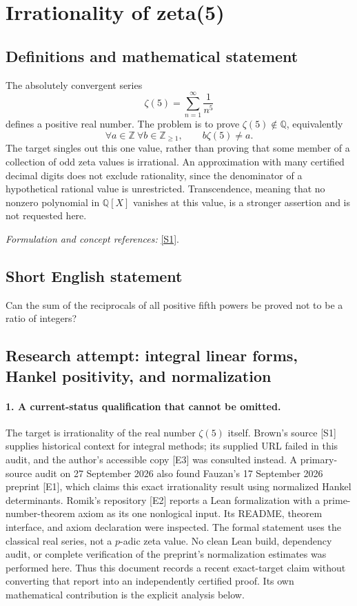 \documentclass[11pt]{article}
\begin{document}
\section*{\texorpdfstring{Irrationality of zeta(5)}{Irrationality of zeta(5)}}\label{statement}
\subsection{Definitions and mathematical statement}
The absolutely convergent series
\[
 \zeta(5)=\sum_{n=1}^{\infty}\frac1{n^5}
\]
defines a positive real number. The problem is to prove $\zeta(5)\notin{\mathbb{Q}}$, equivalently
\[
 \forall a\in{\mathbb{Z}}\ \forall b\in{\mathbb{Z}}_{\ge1},\qquad b\zeta(5)\ne a.
\]
The target singles out this one value, rather than proving that some member of a collection of odd zeta values is irrational. An approximation with many certified decimal digits does not exclude rationality, since the denominator of a hypothetical rational value is unrestricted. Transcendence, meaning that no nonzero polynomial in ${\mathbb{Q}}[X]$ vanishes at this value, is a stronger assertion and is not requested here.
\par\smallskip\textit{Formulation and concept references:} \href{https://www2.mathematik.hu-berlin.de/~kreimer/wp-content/uploads/IrratModuliMotivesv8.pdf}{[S1]}.

\subsection{Short English statement}
Can the sum of the reciprocals of all positive fifth powers be proved not to be a ratio of integers?
\subsection{Research attempt: integral linear forms, Hankel positivity, and normalization}
\paragraph{1. A current-status qualification that cannot be omitted.}
The target is irrationality of the real number $\zeta(5)$ itself. Brown's source [S1] supplies historical context for integral methods; its supplied URL failed in this audit, and the author's accessible copy [E3] was consulted instead. A primary-source audit on 27 September 2026 also found Fauzan's 17 September 2026 preprint [E1], which claims this exact irrationality result using normalized Hankel determinants. Romik's repository [E2] reports a Lean formalization with a prime-number-theorem axiom as its one nonlogical input. Its README, theorem interface, and axiom declaration were inspected. The formal statement uses the classical real series, not a $p$-adic zeta value. No clean Lean build, dependency audit, or complete verification of the preprint's normalization estimates was performed here. Thus this document records a recent exact-target claim without converting that report into an independently certified proof. Its own mathematical contribution is the explicit analysis below.
\end{document}
